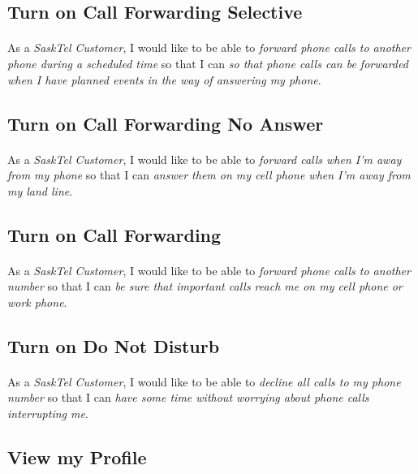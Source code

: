 \documentclass[12pt]{article}
\begin{document}
\subsection{Turn on Call Forwarding Selective}
\paragraph{}	As a \textit{SaskTel Customer}, I would like to be able to \textit{forward phone calls to another phone during a scheduled time} so that I can \textit{so that phone calls can be forwarded when I have planned events in the way of answering my phone}.

\subsection{Turn on Call Forwarding No Answer}
\paragraph{}	As a \textit{SaskTel Customer}, I would like to be able to \textit{forward calls when I'm away from my phone} so that I can \textit{answer them on my cell phone when I'm away from my land line}.

\subsection{Turn on Call Forwarding}
\paragraph{}	As a \textit{SaskTel Customer}, I would like to be able to \textit{forward phone calls to another number} so that I can \textit{be sure that important calls reach me on my cell phone or work phone}.

\subsection{Turn on Do Not Disturb}
\paragraph{}	As a \textit{SaskTel Customer}, I would like to be able to \textit{decline all calls to my phone number} so that I can \textit{have some time without worrying about phone calls interrupting me}.

\subsection{View my Profile}
\end{document}
